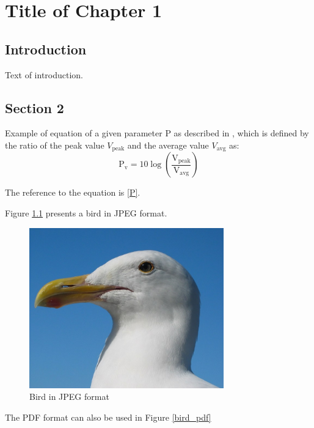 \chapter{Title of Chapter 1}

\section{Introduction}

Text of introduction.

\section{Section 2}

Example of equation of a given parameter P as described in \cite{Author2020}, which is defined by the ratio of the peak value $V_{\text{peak}}$ and the average value $V_{\text{avg}}$ as:
\begin{equation}
	\label{P}
	\text{P}_{\text{v}}=10\log\left( \frac{\text{V}_{\text{peak}}}{\text{V}_{\text{avg}}} \right)
\end{equation}

The reference to the equation is \eqref{P}.

Figure \ref{bird_jpeg} presents a bird in JPEG format.

\begin{figure}[!h]
	\centering
	\includegraphics[width=0.75\textwidth,]{Figures_Chapter_1/bird.jpg}
	\caption{Bird in JPEG format}
	\label{bird_jpeg}
\end{figure}

The PDF format can also be used in Figure \ref{bird_pdf}

